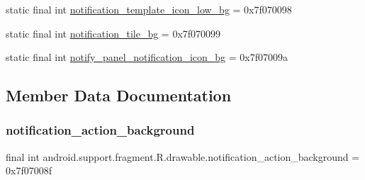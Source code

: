 \begin{DoxyCompactItemize}
\item 
static final int \mbox{\hyperlink{classandroid_1_1support_1_1fragment_1_1R_1_1drawable_a66725999702b63cc02f2470d96c99744}{notification\+\_\+template\+\_\+icon\+\_\+low\+\_\+bg}} = 0x7f070098
\item 
static final int \mbox{\hyperlink{classandroid_1_1support_1_1fragment_1_1R_1_1drawable_a424a9574524ba829feba39ffb0d5f208}{notification\+\_\+tile\+\_\+bg}} = 0x7f070099
\item 
static final int \mbox{\hyperlink{classandroid_1_1support_1_1fragment_1_1R_1_1drawable_a5972fbc11817ad2e0cbb34f744075a95}{notify\+\_\+panel\+\_\+notification\+\_\+icon\+\_\+bg}} = 0x7f07009a
\end{DoxyCompactItemize}


\subsection{Member Data Documentation}
\mbox{\label{classandroid_1_1support_1_1fragment_1_1R_1_1drawable_a086af7e7931dbe4e82c720a77fe3d3ae}} 
\subsubsection{\texorpdfstring{notification\+\_\+action\+\_\+background}{notification\_action\_background}}
{\footnotesize\ttfamily final int android.\+support.\+fragment.\+R.\+drawable.\+notification\+\_\+action\+\_\+background = 0x7f07008f\hspace{0.3cm}{\ttfamily [static]}}

\mbox{\label{classandroid_1_1support_1_1fragment_1_1R_1_1drawable_a6f047fed5aab004876674c2a21947011}} 
